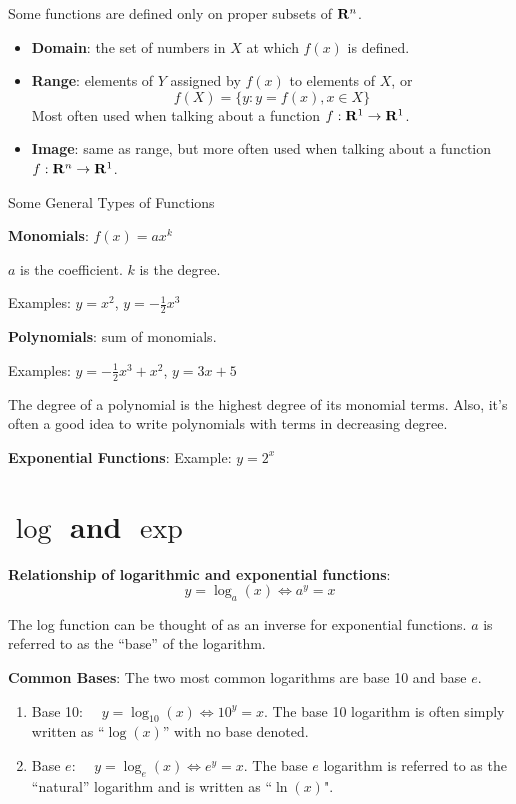 \documentclass[
]{book}
\providecommand{\tightlist}{%
  \setlength{\itemsep}{0pt}\setlength{\parskip}{0pt}}
\theoremstyle{definition}
\theoremstyle{definition}
\theoremstyle{definition}
\theoremstyle{remark}
\begin{document}
Some functions are defined only on proper subsets of \({\bf R}^n\).

\begin{itemize}
\tightlist
\item
  \textbf{Domain}: the set of numbers in \(X\) at which \(f(x)\) is defined.
\item
  \textbf{Range}: elements of \(Y\) assigned by \(f(x)\) to elements of \(X\), or \[f(X)=\{ y : y=f(x), x\in X\}\]
  Most often used when talking about a function \(f:{\bf R}^1\to{\bf R}^1\).
\item
  \textbf{Image}: same as range, but more often used when talking about a function \(f:{\bf R}^n\to{\bf R}^1\).
\end{itemize}

Some General Types of Functions

\textbf{Monomials}: \(f(x)=a x^k\)

\(a\) is the coefficient. \(k\) is the degree.

Examples: \(y=x^2\), \(y=-\frac{1}{2}x^3\)

\textbf{Polynomials}: sum of monomials.

Examples: \(y=-\frac{1}{2}x^3+x^2\), \(y=3x+5\)

The degree of a polynomial is the highest degree of its monomial terms. Also, it's often a good idea to write polynomials with terms in decreasing degree.

\textbf{Exponential Functions}: Example: \(y=2^x\)

\hypertarget{logexponents}{%
\section{\texorpdfstring{\(\log\) and \(\exp\)}{\textbackslash log and \textbackslash exp}}\label{logexponents}}

\textbf{Relationship of logarithmic and exponential functions}:
\[y=\log_a(x) \iff a^y=x\]

The log function can be thought of as an inverse for exponential functions. \(a\) is referred to as the ``base'' of the logarithm.

\textbf{Common Bases}: The two most common logarithms are base 10 and base \(e\).

\begin{enumerate}
\def\labelenumi{\arabic{enumi}.}
\tightlist
\item
  Base 10: \(\quad y=\log_{10}(x) \iff 10^y=x\). The base 10 logarithm is often simply written as ``\(\log(x)\)'' with no base denoted.
\item
  Base \(e\): \(\quad y=\log_e(x) \iff e^y=x\). The base \(e\) logarithm is referred to as the ``natural'' logarithm and is written as ``\(\ln(x)\)".
\end{enumerate}
\end{document}
